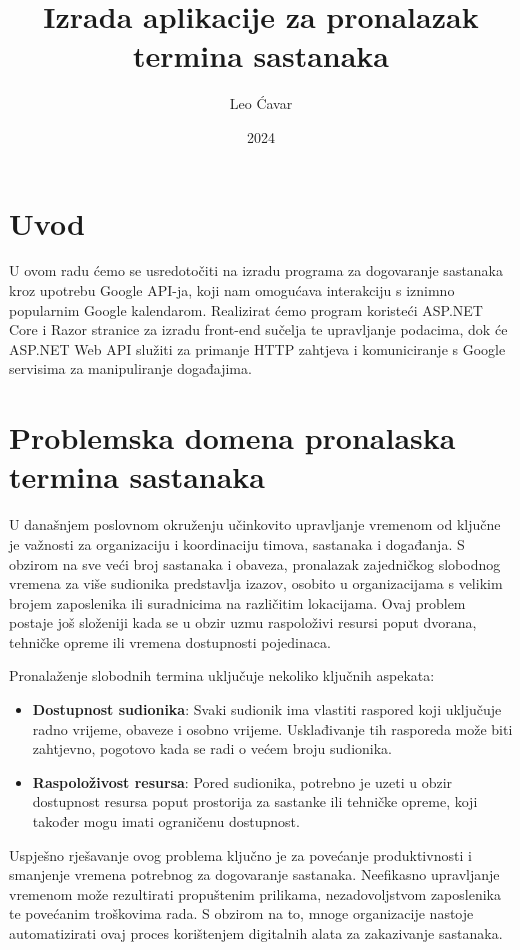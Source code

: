 \documentclass{foi}
\title{Izrada aplikacije za pronalazak termina sastanaka}
\author{Leo Ćavar}
\date{2024}
\begin{document}
\maketitle

\tableofcontents

\pagestyle{plain}
\chapter{Uvod}
U ovom radu ćemo se usredotočiti na izradu programa za dogovaranje sastanaka kroz upotrebu Google API-ja, koji nam omogućava interakciju s iznimno popularnim Google kalendarom. Realizirat ćemo program koristeći ASP.NET Core i Razor stranice za izradu front-end sučelja te upravljanje podacima, dok će ASP.NET Web API služiti za primanje HTTP zahtjeva i komuniciranje s Google servisima za manipuliranje događajima.

\chapter{Problemska domena pronalaska termina sastanaka}

U današnjem poslovnom okruženju učinkovito upravljanje vremenom od ključne je važnosti za organizaciju i koordinaciju timova, sastanaka i događanja. S obzirom na sve veći broj sastanaka i obaveza, pronalazak zajedničkog slobodnog vremena za više sudionika predstavlja izazov, osobito u organizacijama s velikim brojem zaposlenika ili suradnicima na različitim lokacijama. Ovaj problem postaje još složeniji kada se u obzir uzmu raspoloživi resursi poput dvorana, tehničke opreme ili vremena dostupnosti pojedinaca.

Pronalaženje slobodnih termina uključuje nekoliko ključnih aspekata:
\begin{itemize}
    \item \textbf{Dostupnost sudionika}: Svaki sudionik ima vlastiti raspored koji uključuje radno vrijeme, obaveze i osobno vrijeme. Usklađivanje tih rasporeda može biti zahtjevno, pogotovo kada se radi o većem broju sudionika.
    \item \textbf{Raspoloživost resursa}: Pored sudionika, potrebno je uzeti u obzir dostupnost resursa poput prostorija za sastanke ili tehničke opreme, koji također mogu imati ograničenu dostupnost.
\end{itemize}


Uspješno rješavanje ovog problema ključno je za povećanje produktivnosti i smanjenje vremena potrebnog za dogovaranje sastanaka. Neefikasno upravljanje vremenom može rezultirati propuštenim prilikama, nezadovoljstvom zaposlenika te povećanim troškovima rada. S obzirom na to, mnoge organizacije nastoje automatizirati ovaj proces korištenjem digitalnih alata za zakazivanje sastanaka.
\end{document}
